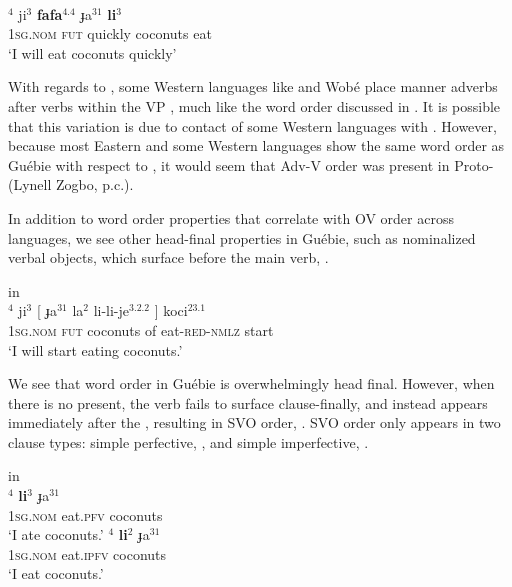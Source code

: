\documentclass[output=paper,newtxmath,modfonts,nonflat,draftmode]{langsci/langscibook}
\begin{document}
\\
$^{4}$ {ji}$^{3}$ \textbf{{fafa}$^{4.4}$} {ɟa}$^{31}$ \textbf{{li}$^{3}$} \\
\textsc{1sg}.\textsc{nom} \textsc{fut} quickly  coconuts eat \\
\glt `I will eat coconuts quickly' \label{advv}
\z
\z

With regards to , some Western  languages like  and Wobé place manner adverbs after verbs within the VP \citep[80-81]{Marchese1979}, much like the  word order discussed in . It is possible that this variation is due to contact of some Western  languages with . However, because most Eastern and some Western  languages show the same word order as Guébie with respect to , it would seem that Adv-V order was present in Proto- (Lynell Zogbo, p.c.).

In addition to word order properties that correlate with OV order across languages, we see other head-final properties in Guébie, such as nominalized verbal objects, which surface before the main verb, .

\newpage 
{} in \\ \label{ex:5:Guebie}
$^{4}$ {ji}$^{3}$ [ {ɟa}$^{31}$ {la}$^{2}$ {li-li-je}$^{3.2.2}$ ] {koci}$^{23.1}$ \\
\textsc{1sg}.\textsc{nom} \textsc{fut} {} coconuts of eat-\textsc{red}-\textsc{nmlz} {} start \\
\glt `I will start eating coconuts.'
\z

We see that word order in Guébie is overwhelmingly head final. However, when there is no  present, the verb fails to surface clause-finally, and instead appears immediately after the , resulting in SVO order, . SVO order only appears in two clause types: simple perfective, ,  and simple imperfective, .

 in \\ \label{ex:6:Guebie}
\ea 
{}$^{4}$ \textbf{{li}$^{3}$}  {ɟa}$^{31}$ \\
\textsc{1sg}.\textsc{nom} eat.\textsc{pfv} coconuts \\
\glt `I ate coconuts.' \label{ex:6a:Guebie}
\ex 
{}$^{4}$ \textbf{{li}$^{2}$}  {ɟa}$^{31}$ \\
\textsc{1sg}.\textsc{nom} eat.\textsc{ipfv} coconuts \\
\glt `I eat coconuts.' \label{ex:6b:Guebie}
\z
\z
\end{document}
